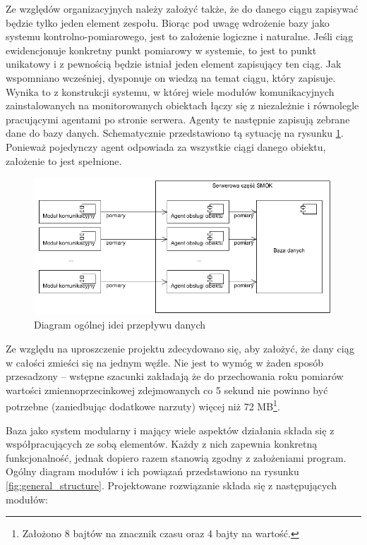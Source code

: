 \documentclass[a4paper,polish,12pt,twoside]{article}
\begin{document}
Ze względów organizacyjnych należy założyć także, że do danego ciągu zapisywać będzie tylko jeden element zespołu. Biorąc pod uwagę wdrożenie bazy jako systemu kontrolno-pomiarowego, jest to założenie logiczne i naturalne. Jeśli ciąg ewidencjonuje konkretny punkt pomiarowy w systemie, to jest to punkt unikatowy i z pewnością będzie istniał jeden element zapisujący ten ciąg. Jak wspomniano wcześniej, dysponuje on wiedzą na temat ciągu, który zapisuje. Wynika to z konstrukcji systemu, w której wiele modułów komunikacyjnych zainstalowanych na monitorowanych obiektach łączy się z niezależnie i równolegle pracującymi agentami po stronie serwera. Agenty te następnie zapisują zebrane dane do bazy danych. Schematycznie przedstawiono tą sytuację na rysunku \ref{fig:smok_generaldataflow}. Ponieważ pojedynczy agent odpowiada za wszystkie ciągi danego obiektu, założenie to jest spełnione.

	\begin{figure}[h]
		\centering \includegraphics[width=15cm]{smok_generaldataflow}
		\caption{Diagram ogólnej idei przepływu danych}
		\label{fig:smok_generaldataflow}
	\end{figure}

Ze względu na uproszczenie projektu zdecydowano się, aby założyć, że dany ciąg w całości zmieści się na jednym węźle. Nie jest to wymóg w żaden sposób przesadzony – wstępne szacunki zakładają że do przechowania roku pomiarów wartości zmiennoprzecinkowej zdejmowanych co 5 sekund nie powinno być potrzebne (zaniedbując dodatkowe narzuty) więcej niż 72 MB\footnote{Założono 8 bajtów na znacznik czasu oraz 4 bajty na wartość.}.

Baza jako system modularny i mający wiele aspektów działania składa się z współpracujących ze sobą elementów. Każdy z nich zapewnia konkretną funkcjonalność, jednak dopiero razem stanowią zgodny z założeniami program. Ogólny diagram modułów i ich powiązań przedstawiono na rysunku \ref{fig:general_structure}. Projektowane rozwiązanie składa się z następujących modułów:
\end{document}
